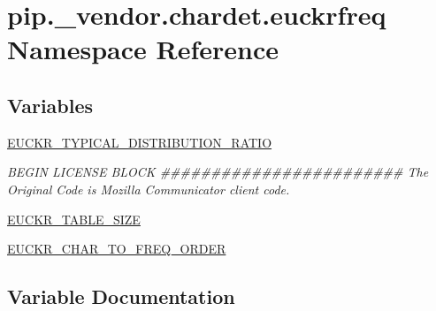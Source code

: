 \hypertarget{namespacepip_1_1__vendor_1_1chardet_1_1euckrfreq}{}\section{pip.\+\_\+vendor.\+chardet.\+euckrfreq Namespace Reference}
\label{namespacepip_1_1__vendor_1_1chardet_1_1euckrfreq}
\subsection*{Variables}
\begin{DoxyCompactItemize}
\item 
\hyperlink{namespacepip_1_1__vendor_1_1chardet_1_1euckrfreq_a754dfdc89778a9da3e768d6ff46c3d4a}{E\+U\+C\+K\+R\+\_\+\+T\+Y\+P\+I\+C\+A\+L\+\_\+\+D\+I\+S\+T\+R\+I\+B\+U\+T\+I\+O\+N\+\_\+\+R\+A\+T\+IO}
\begin{DoxyCompactList}\small\item\em B\+E\+G\+IN L\+I\+C\+E\+N\+SE B\+L\+O\+CK \#\#\#\#\#\#\#\#\#\#\#\#\#\#\#\#\#\#\#\#\#\#\#\# The Original Code is Mozilla Communicator client code. \end{DoxyCompactList}\item 
\hyperlink{namespacepip_1_1__vendor_1_1chardet_1_1euckrfreq_aa9fb61230534f62b536f9b76cb272ab3}{E\+U\+C\+K\+R\+\_\+\+T\+A\+B\+L\+E\+\_\+\+S\+I\+ZE}
\item 
\hyperlink{namespacepip_1_1__vendor_1_1chardet_1_1euckrfreq_aa84a5a1a763fa65bf7a78bfa463ee7bb}{E\+U\+C\+K\+R\+\_\+\+C\+H\+A\+R\+\_\+\+T\+O\+\_\+\+F\+R\+E\+Q\+\_\+\+O\+R\+D\+ER}
\end{DoxyCompactItemize}


\subsection{Variable Documentation}
\mbox{\label{namespacepip_1_1__vendor_1_1chardet_1_1euckrfreq_aa84a5a1a763fa65bf7a78bfa463ee7bb}} 
